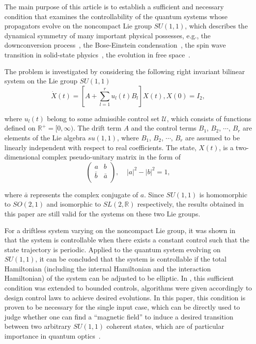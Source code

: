 \documentclass[onecolumn,showpacs,showkeys,preprintnumbers]{revtex4}
\begin{document}
The main purpose of this article is to establish a sufficient and
necessary condition that examines the controllability of the
quantum systems whose propagators evolve on the noncompact Lie
group $SU(1,1)$, which describes the dynamical symmetry of many
important physical possesses, e.g., the downconversion
process~\cite{Puri1,Gerry2}, the Bose-Einstein
condensation~\cite{Gortel1}, the spin wave transition in
solid-state physics~\cite{Bose1}, the evolution in free
space~\cite{Agarwal1}.

The problem is investigated by considering the following right
invariant bilinear system on the Lie group $SU(1,1)$\noindent\begin{equation}\label{eq1.1}
\dot{X}(t)=\left[A+\sum\limits_{l=1}^{r}u_l(t)B_l\right]X(t),
X(0)=I_2,
\end{equation}

\noindent where $u_l(t)$ belong to some admissible control set
$\mathcal{U}$, which consists of functions defined on
$\mathbb{R}^+=[0,\infty)$. The drift term $A$ and the control
terms $B_1$, $B_2$, $\cdots$, $B_r$ are elements of the Lie
algebra $su(1,1)$, where $B_1$, $B_2$, $\cdots$, $B_r$ are assumed
to be linearly independent with respect to real coefficients. The
state, $X(t)$, is a two-dimensional complex pseudo-unitary
matrix in the form of\noindent\begin{equation}\label{eq1.2}
 \left(\begin{array}{cc}
  a & b \\
  \bar{b} & \bar{a}\\
\end{array}\right),~~~~~|a|^2-|b|^2=1,
\end{equation}

\noindent where $\bar{a}$ represents the complex conjugate of $a$.
Since $SU(1,1)$ is homomorphic to $SO(2,1)$ and isomorphic to
$SL(2,\mathbb{R})$ respectively, the results obtained in this
paper are still valid for the systems on these two Lie groups.

For a driftless system varying on the noncompact Lie group, it was
shown in~\cite{Jurdjevic1} that the system is controllable when
there exists a constant control such that the state trajectory is
periodic. Applied to the quantum system evolving on $SU(1,1)$, it
can be concluded that the system is controllable if the total
Hamiltonian (including the internal Hamiltonian and the
interaction Hamiltonian) of the system can be adjusted to be
elliptic. In \cite{wjw1}, this sufficient condition was extended
to bounded controls, algorithms were given accordingly to design
control laws to achieve desired evolutions. In this paper, this
condition is proven to be necessary for the single input case,
which can be directly used to judge whether one can find a
``magnetic field'' to induce a desired transition between two
arbitrary $SU(1,1)$ coherent states, which are of particular
importance in quantum optics~\cite{Gerry1,Walls1}.
\end{document}
